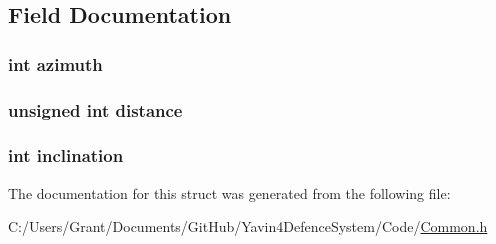 \subsection{Field Documentation}
\hypertarget{structTrackingData_a866e78e12cb32dcaf1ded89bda8be8f5}{
\subsubsection[{azimuth}]{\setlength{\rightskip}{0pt plus 5cm}int azimuth}}\label{structTrackingData_a866e78e12cb32dcaf1ded89bda8be8f5}
\hypertarget{structTrackingData_a4bb47863775a37236bda65273c01b275}{
\subsubsection[{distance}]{\setlength{\rightskip}{0pt plus 5cm}unsigned int distance}}\label{structTrackingData_a4bb47863775a37236bda65273c01b275}
\hypertarget{structTrackingData_af308b9934394c8bcf7614eb1df2d863f}{
\subsubsection[{inclination}]{\setlength{\rightskip}{0pt plus 5cm}int inclination}}\label{structTrackingData_af308b9934394c8bcf7614eb1df2d863f}


The documentation for this struct was generated from the following file\+:\begin{DoxyCompactItemize}
\item 
C\+:/\+Users/\+Grant/\+Documents/\+Git\+Hub/\+Yavin4\+Defence\+System/\+Code/\hyperlink{Common_8h}{Common.\+h}\end{DoxyCompactItemize}
